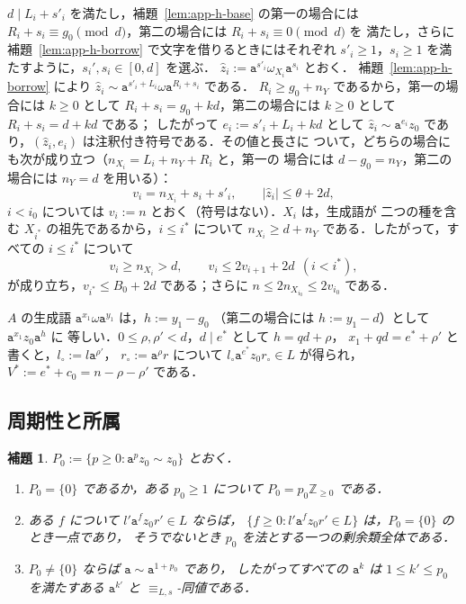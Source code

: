 \documentclass[11pt,a4paper]{ltjsarticle}
\numberwithin{equation}{section}
\theoremstyle{plain}
\newtheorem{lemma}[theorem]{補題}
\theoremstyle{definition}
\theoremstyle{remark}
\theoremstyle{plain}
\begin{document}
$d\mid L_i+s'_i$ を満たし，補題~\ref{lem:app-h-base} の第一の場合には
$R_i+s_i\equiv g_0\pmod d$，第二の場合には $R_i+s_i\equiv0\pmod d$ を
満たし，さらに補題~\ref{lem:app-h-borrow} で文字を借りるときにはそれぞれ
$s'_i\ge1$，$s_i\ge1$ を満たすように，$s_i',s_i\in[0,d]$ を選ぶ．
$\hat z_i:=\mathtt a^{s'_i}\omega_{X_i}\mathtt a^{s_i}$ とおく．
補題~\ref{lem:app-h-borrow} により
$\hat z_i\sim\mathtt a^{s'_i+L_i}\omega\mathtt a^{R_i+s_i}$ である．
$R_i\ge g_0+n_Y$ であるから，第一の場合には $k\ge0$ として
$R_i+s_i=g_0+kd$，第二の場合には $k\ge0$ として $R_i+s_i=d+kd$ である；
したがって $e_i:=s'_i+L_i+kd$ として $\hat z_i\sim\mathtt a^{e_i}z_0$
であり，$(\hat z_i,e_i)$ は注釈付き符号である．その値と長さに
ついて，どちらの場合にも次が成り立つ（$n_{X_i}=L_i+n_Y+R_i$ と，第一の
場合には $d-g_0=n_Y$，第二の場合には $n_Y=d$ を用いる）：
\[
 v_i=n_{X_i}+s_i+s'_i,\qquad|\hat z_i|\le\theta+2d,
\]
$i<i_0$ については $v_i:=n$ とおく（符号はない）．$X_i$ は，生成語が
二つの種を含む $X_{i^*}$ の祖先であるから，$i\le i^*$ について
$n_{X_i}\ge d+n_Y$ である．したがって，すべての $i\le i^*$ について
\begin{equation}
\label{eq:app-h-star}
 v_i\ge n_{X_i}>d,\qquad v_i\le2v_{i+1}+2d\ \ (i<i^*),
\end{equation}
が成り立ち，$v_{i^*}\le B_0+2d$ である；さらに
$n\le2n_{X_{i_0}}\le2v_{i_0}$ である．

$A$ の生成語 $\mathtt a^{x_1}\omega\mathtt a^{y_1}$ は，$h:=y_1-g_0$
（第二の場合には $h:=y_1-d$）として $\mathtt a^{x_1}z_0\mathtt a^{h}$ に
等しい．$0\le\rho,\rho'<d$，$d\mid e^*$ として $h=qd+\rho$，
$x_1+qd=e^*+\rho'$ と書くと，$l_\circ:=l\mathtt a^{\rho'}$，
$r_\circ:=\mathtt a^\rho r$ について $l_\circ\mathtt a^{e^*}z_0r_\circ\in L$
が得られ，$V^*:=e^*+c_0=n-\rho-\rho'$ である．

\subsection{周期性と所属}

\begin{lemma}
\label{lem:app-h-period}
$P_0:=\{p\ge0:\mathtt a^pz_0\sim z_0\}$ とおく．
\begin{enumerate}[label=\textup{(\roman*)},leftmargin=*]
\item $P_0=\{0\}$ であるか，ある $p_0\ge1$ について
$P_0=p_0\mathbb Z_{\ge0}$ である．
\item ある $f$ について $l'\mathtt a^fz_0r'\in L$ ならば，
$\{f\ge0:l'\mathtt a^fz_0r'\in L\}$ は，$P_0=\{0\}$ のとき一点であり，
そうでないとき $p_0$ を法とする一つの剰余類全体である．
\item $P_0\ne\{0\}$ ならば $\mathtt a\sim\mathtt a^{1+p_0}$ であり，
したがってすべての $\mathtt a^k$ は $1\le k'\le p_0$ を満たすある
$\mathtt a^{k'}$ と $\equiv_{L,s}$-同値である．
\end{enumerate}
\end{lemma}
\end{document}
